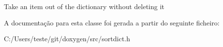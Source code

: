 Take an item out of the dictionary without deleting it 

A documentação para esta classe foi gerada a partir do seguinte ficheiro\-:\begin{DoxyCompactItemize}
\item 
C\-:/\-Users/teste/git/doxygen/src/sortdict.\-h\end{DoxyCompactItemize}
